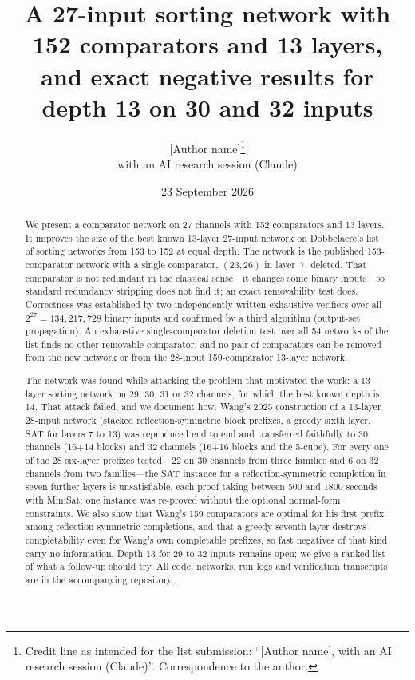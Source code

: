 \documentclass[11pt,a4paper]{article}
\title{A 27-input sorting network with 152 comparators and 13 layers,\\
and exact negative results for depth 13 on 30 and 32 inputs}
\author{[Author name]\thanks{Credit line as intended for the list submission: ``[Author name], with an AI research session (Claude)''. Correspondence to the author.}\\[2pt]
\small with an AI research session (Claude)}
\date{23 September 2026}
\theoremstyle{plain}
\theoremstyle{definition}
\theoremstyle{remark}
\begin{document}
\maketitle

\begin{abstract}
\noindent
We present a comparator network on 27 channels with 152 comparators and 13 layers. It improves the size of the best known 13-layer 27-input network on Dobbelaere's list of sorting networks from 153 to 152 at equal depth. The network is the published 153-comparator network with a single comparator, $(23,26)$ in layer~7, deleted. That comparator is not redundant in the classical sense---it changes some binary inputs---so standard redundancy stripping does not find it; an exact removability test does. Correctness was established by two independently written exhaustive verifiers over all $2^{27}=134{,}217{,}728$ binary inputs and confirmed by a third algorithm (output-set propagation). An exhaustive single-comparator deletion test over all 54 networks of the list finds no other removable comparator, and no pair of comparators can be removed from the new network or from the 28-input 159-comparator 13-layer network.

The network was found while attacking the problem that motivated the work: a 13-layer sorting network on 29, 30, 31 or 32 channels, for which the best known depth is 14. That attack failed, and we document how. Wang's 2025 construction of a 13-layer 28-input network (stacked reflection-symmetric block prefixes, a greedy sixth layer, SAT for layers 7 to 13) was reproduced end to end and transferred faithfully to 30 channels (16+14 blocks) and 32 channels (16+16 blocks and the 5-cube). For every one of the 28 six-layer prefixes tested---22 on 30 channels from three families and 6 on 32 channels from two families---the SAT instance for a reflection-symmetric completion in seven further layers is unsatisfiable, each proof taking between 500 and 1800 seconds with MiniSat; one instance was re-proved without the optional normal-form constraints. We also show that Wang's 159 comparators are optimal for his first prefix among reflection-symmetric completions, and that a greedy seventh layer destroys completability even for Wang's own completable prefixes, so fast negatives of that kind carry no information. Depth 13 for 29 to 32 inputs remains open; we give a ranked list of what a follow-up should try. All code, networks, run logs and verification transcripts are in the accompanying repository.
\end{abstract}
\end{document}
